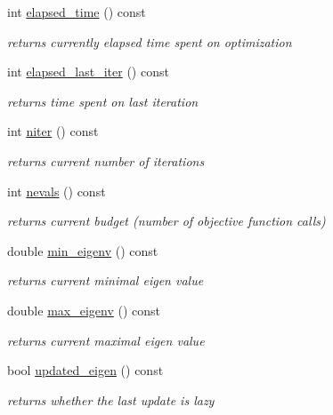 \begin{DoxyCompactItemize}
int \hyperlink{classlibcmaes_1_1CMASolutions_add680b4437a6a2786b7a6228fa73023e}{elapsed\+\_\+time} () const 
\begin{DoxyCompactList}\small\item\em returns currently elapsed time spent on optimization \end{DoxyCompactList}\item 
int \hyperlink{classlibcmaes_1_1CMASolutions_a5b6c88e6f490f9135bd0795ee9062f4a}{elapsed\+\_\+last\+\_\+iter} () const 
\begin{DoxyCompactList}\small\item\em returns time spent on last iteration \end{DoxyCompactList}\item 
int \hyperlink{classlibcmaes_1_1CMASolutions_aceb58df5ee91f159e626b51ee788c381}{niter} () const 
\begin{DoxyCompactList}\small\item\em returns current number of iterations \end{DoxyCompactList}\item 
int \hyperlink{classlibcmaes_1_1CMASolutions_a225f3f00557469d3cf7567d0dd301fc0}{nevals} () const 
\begin{DoxyCompactList}\small\item\em returns current budget (number of objective function calls) \end{DoxyCompactList}\item 
double \hyperlink{classlibcmaes_1_1CMASolutions_af0b9acecd0f092ce781d4bb1119f5844}{min\+\_\+eigenv} () const 
\begin{DoxyCompactList}\small\item\em returns current minimal eigen value \end{DoxyCompactList}\item 
double \hyperlink{classlibcmaes_1_1CMASolutions_a600c62ab2769f9eab18951c49846e003}{max\+\_\+eigenv} () const 
\begin{DoxyCompactList}\small\item\em returns current maximal eigen value \end{DoxyCompactList}\item 
bool \hyperlink{classlibcmaes_1_1CMASolutions_a82171a1285713a228bce32c923fc65fd}{updated\+\_\+eigen} () const 
\begin{DoxyCompactList}\small\item\em returns whether the last update is lazy \end{DoxyCompactList}\item 

\end{DoxyCompactItemize}
